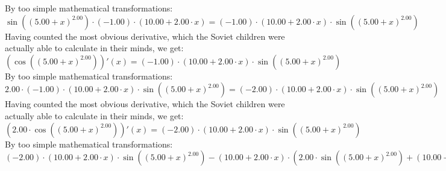 \documentclass{article}
\begin{document}
\newline
By too simple mathematical transformations:
 ${{ \sin {\left({\left({{5.00} + {x}}\right) ^ {2.00}}\right)}  \cdot \left({-1.00}\right)} \cdot \left({{10.00} + {{2.00} \cdot {x}}}\right)} = {\left({-1.00}\right) \cdot {\left({{10.00} + {{2.00} \cdot {x}}}\right) \cdot  \sin {\left({\left({{5.00} + {x}}\right) ^ {2.00}}\right)} }}$ 
 \newline
 \newline 
Having counted the most obvious derivative, which the Soviet children were actually able to calculate in their minds, we get:
$( \cos {\left({\left({{5.00} + {x}}\right) ^ {2.00}}\right)} )'(x) = {\left({-1.00}\right) \cdot {\left({{10.00} + {{2.00} \cdot {x}}}\right) \cdot  \sin {\left({\left({{5.00} + {x}}\right) ^ {2.00}}\right)} }}$\newline
\newline
By too simple mathematical transformations:
 ${{2.00} \cdot {\left({-1.00}\right) \cdot {\left({{10.00} + {{2.00} \cdot {x}}}\right) \cdot  \sin {\left({\left({{5.00} + {x}}\right) ^ {2.00}}\right)} }}} = {\left({-2.00}\right) \cdot {\left({{10.00} + {{2.00} \cdot {x}}}\right) \cdot  \sin {\left({\left({{5.00} + {x}}\right) ^ {2.00}}\right)} }}$ 
 \newline
 \newline 
Having counted the most obvious derivative, which the Soviet children were actually able to calculate in their minds, we get:
$({{2.00} \cdot  \cos {\left({\left({{5.00} + {x}}\right) ^ {2.00}}\right)} })'(x) = {\left({-2.00}\right) \cdot {\left({{10.00} + {{2.00} \cdot {x}}}\right) \cdot  \sin {\left({\left({{5.00} + {x}}\right) ^ {2.00}}\right)} }}$\newline
\newline
By too simple mathematical transformations:
 ${{{\left({-2.00}\right) \cdot {\left({{10.00} + {{2.00} \cdot {x}}}\right) \cdot  \sin {\left({\left({{5.00} + {x}}\right) ^ {2.00}}\right)} }} - {\left({{10.00} + {{2.00} \cdot {x}}}\right) \cdot \left({{{2.00} \cdot  \sin {\left({\left({{5.00} + {x}}\right) ^ {2.00}}\right)} } + {\left({{10.00} + {{2.00} \cdot {x}}}\right) \cdot { \cos {\left({\left({{5.00} + {x}}\right) ^ {2.00}}\right)}  \cdot \left({{10.00} + {{2.00} \cdot {x}}}\right)}}}\right)}} + {\left({-2.00}\right) \cdot {\left({{10.00} + {{2.00} \cdot {x}}}\right) \cdot  \sin {\left({\left({{5.00} + {x}}\right) ^ {2.00}}\right)} }}} = {{{\left({-2.00}\right) \cdot {\left({{10.00} + {{2.00} \cdot {x}}}\right) \cdot  \sin {\left({\left({{5.00} + {x}}\right) ^ {2.00}}\right)} }} - {\left({{10.00} + {{2.00} \cdot {x}}}\right) \cdot \left({{{2.00} \cdot  \sin {\left({\left({{5.00} + {x}}\right) ^ {2.00}}\right)} } + {\left({{10.00} + {{2.00} \cdot {x}}}\right) \cdot { \cos {\left({\left({{5.00} + {x}}\right) ^ {2.00}}\right)}  \cdot \left({{10.00} + {{2.00} \cdot {x}}}\right)}}}\right)}} - {{2.00} \cdot {\left({{10.00} + {{2.00} \cdot {x}}}\right) \cdot  \sin {\left({\left({{5.00} + {x}}\right) ^ {2.00}}\right)} }}}$ 
\end{document}
